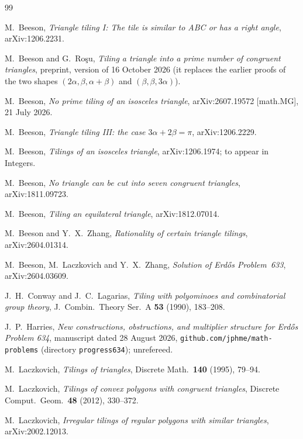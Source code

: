 \documentclass[11pt,reqno]{amsart}
\theoremstyle{plain}
\theoremstyle{definition}
\begin{document}
\begin{thebibliography}{99}

 M.~Beeson, \emph{Triangle tiling I: The tile is similar to ABC or has a right angle},
arXiv:1206.2231.

 M.~Beeson and G.~Ro\c{s}u, \emph{Tiling a triangle into a prime number of congruent triangles}, preprint,
version of 16 October 2026 (it replaces the earlier proofs of the two shapes $(2\alpha,\beta,\alpha+\beta)$ and $(\beta,\beta,3\alpha)$).

 M.~Beeson, \emph{No prime tiling of an isosceles triangle}, arXiv:2607.19572
[math.MG], 21 July 2026.

 M.~Beeson, \emph{Triangle tiling III: the case $3\alpha+2\beta=\pi$},
arXiv:1206.2229.

 M.~Beeson, \emph{Tilings of an isosceles triangle}, arXiv:1206.1974; to appear in
Integers.

 M.~Beeson, \emph{No triangle can be cut into seven congruent triangles},
arXiv:1811.09723.

 M.~Beeson, \emph{Tiling an equilateral triangle}, arXiv:1812.07014.

 M.~Beeson and Y.~X.~Zhang, \emph{Rationality of certain triangle tilings},
arXiv:2604.01314.

 M.~Beeson, M.~Laczkovich and Y.~X.~Zhang, \emph{Solution of Erd\H{o}s Problem~633},
arXiv:2604.03609.

 J.~H.~Conway and J.~C.~Lagarias, \emph{Tiling with polyominoes and combinatorial
group theory}, J.\ Combin.\ Theory Ser.\ A \textbf{53} (1990), 183--208.

 J.~P.~Harries, \emph{New constructions, obstructions, and multiplier structure for
Erd\H{o}s Problem 634}, manuscript dated 28 August 2026, \texttt{github.com/jphme/math-problems} (directory
\texttt{progress634}); unrefereed.

 M.~Laczkovich, \emph{Tilings of triangles}, Discrete Math.\ \textbf{140} (1995),
79--94.

 M.~Laczkovich, \emph{Tilings of convex polygons with congruent triangles}, Discrete
Comput.\ Geom.\ \textbf{48} (2012), 330--372.

 M.~Laczkovich, \emph{Irregular tilings of regular polygons with similar triangles},
arXiv:2002.12013.


\end{thebibliography}
\end{document}
